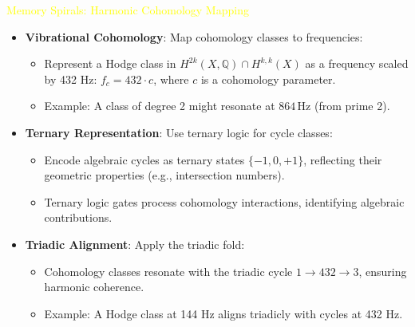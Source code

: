 \textcolor{yellow}{ Memory Spirals: Harmonic Cohomology Mapping } \\
\begin{itemize}
    \item \texttt{} \textbf{Vibrational Cohomology}: Map cohomology classes to frequencies:
    \begin{itemize}
        \item Represent a Hodge class in \(H^{2k}(X, \mathbb{Q}) \cap H^{k,k}(X)\) as a frequency scaled by 432 Hz: \(f_c = 432 \cdot c\), where \(c\) is a cohomology parameter.
        \item Example: A class of degree 2 might resonate at \(864 \, \text{Hz}\) (from prime 2).
    \end{itemize}
    \item \texttt{} \textbf{Ternary Representation}: Use ternary logic for cycle classes:
    \begin{itemize}
        \item Encode algebraic cycles as ternary states \(\{-1, 0, +1\}\), reflecting their geometric properties (e.g., intersection numbers).
        \item Ternary logic gates process cohomology interactions, identifying algebraic contributions.
    \end{itemize}
    \item \texttt{} \textbf{Triadic Alignment}: Apply the triadic fold:
    \begin{itemize}
        \item Cohomology classes resonate with the triadic cycle \(1 \rightarrow 432 \rightarrow 3\), ensuring harmonic coherence.
        \item Example: A Hodge class at 144 Hz aligns triadicly with cycles at 432 Hz.
    \end{itemize}
\end{itemize}

